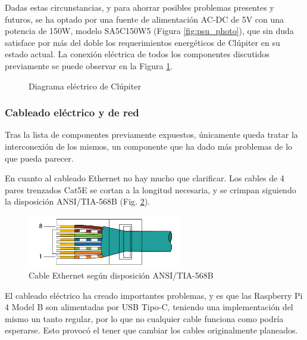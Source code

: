 Dadas estas circunstancias, y para ahorrar posibles problemas presentes y futuros, se ha optado por una fuente de alimentación AC-DC de 5V con una potencia de 150W, modelo SA5C150W5 (Figura \ref{fig:psu_photo}), que sin duda satisface por más del doble los requerimientos energéticos de Clúpiter en su estado actual. La conexión eléctrica de todos los componentes discutidos previamente se puede observar en la Figura \ref{fig:raspi_electric_diagram}.

\begin{figure}[h!]
  \centering
  \vspace*{0.5cm}
  \def\svgwidth{\textwidth}
  
  \caption{Diagrama eléctrico de Clúpiter}
  \label{fig:raspi_electric_diagram}
\end{figure}

\subsubsection{Cableado eléctrico y de red}
\label{sssec:cableado_electrico_red}
Tras la lista de componentes previamente expuestos, únicamente queda tratar la interconexión de los mismos, un componente que ha dado más problemas de lo que pueda parecer.

En cuanto al cableado Ethernet no hay mucho que clarificar. Los cables de 4 pares trenzados Cat5E se cortan a la longitud necesaria, y se crimpan siguiendo la disposición ANSI/TIA-568B (Fig. \ref{fig:TIA-568B-horiz}).

\begin{figure}[h!]
  \centering
  \includegraphics[width=0.6\textwidth]{img/TIA-568B-horizontal.png}
  \caption{Cable Ethernet según disposición ANSI/TIA-568B}
  \label{fig:TIA-568B-horiz}
\end{figure}

El cableado eléctrico ha creado importantes problemas, y es que las Raspberry Pi 4 Model B son alimentadas por USB Tipo-C, teniendo una implementación del mismo un tanto regular, por lo que no cualquier cable funciona como podría esperarse. Esto provocó el tener que cambiar los cables originalmente planeados.

